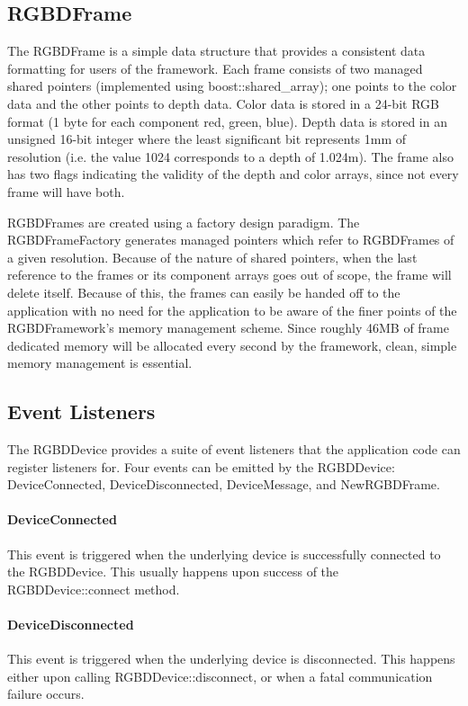 \subsection{RGBDFrame}
The RGBDFrame is a simple data structure that provides a consistent data formatting for users of the framework. Each frame consists of two managed shared pointers (implemented using boost::shared\_array); one points to the color data and the other points to depth data. Color data is stored in a 24-bit RGB format (1 byte for each component red, green, blue). Depth data is stored in an unsigned 16-bit integer where the least significant bit represents 1mm of resolution (i.e. the value 1024 corresponds to a depth of 1.024m). The frame also has two flags indicating the validity of the depth and color arrays, since not every frame will have both.\par
RGBDFrames are created using a factory design paradigm. The RGBDFrameFactory generates managed pointers which refer to RGBDFrames of a given resolution. Because of the nature of shared pointers, when the last reference to the frames or its component arrays goes out of scope, the frame will delete itself. Because of this, the frames can easily be handed off to the application with no need for the application to be aware of the finer points of the RGBDFramework's memory management scheme. Since roughly 46MB of frame dedicated memory will be allocated every second by the framework, clean, simple memory management is essential.
\subsection{Event Listeners}
The RGBDDevice provides a suite of event listeners that the application code can register listeners for. Four events can be emitted by the RGBDDevice: DeviceConnected, DeviceDisconnected, DeviceMessage, and NewRGBDFrame.
\paragraph{DeviceConnected}
This event is triggered when the underlying device is successfully connected to the RGBDDevice. This usually happens upon success of the RGBDDevice::connect method.
\paragraph{DeviceDisconnected}
This event is triggered when the underlying device is disconnected. This happens either upon calling RGBDDevice::disconnect, or when a fatal communication failure occurs.
